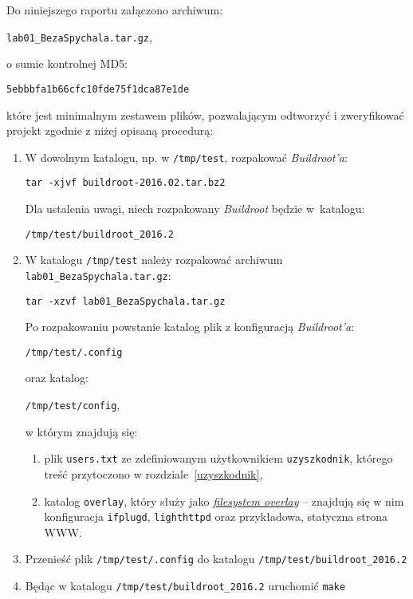 \documentclass{article}
\begin{document}
Do niniejszego raportu załączono archiwum:
\begin{center}
\texttt{lab01\_BezaSpychala.tar.gz},
\end{center}
o sumie kontrolnej MD5:
\begin{center}
\texttt{5ebbbfa1b66cfc10fde75f1dca87e1de}
\end{center}
które jest minimalnym zestawem plików, pozwalającym odtworzyć i zweryfikować projekt zgodnie z niżej opisaną procedurą:
\begin{enumerate}
\item W dowolnym katalogu, np. w \texttt{/tmp/test}, rozpakować \emph{Buildroot'a}:
\begin{center}
\texttt{tar -xjvf buildroot-2016.02.tar.bz2}
\end{center}

Dla ustalenia uwagi, niech rozpakowany \emph{Buildroot} będzie w~katalogu:
\begin{center}
\texttt{/tmp/test/buildroot\_2016.2}
\end{center}

\item W katalogu \texttt{/tmp/test} należy rozpakować archiwum \texttt{lab01\_BezaSpychala.tar.gz}:
\begin{center}
\texttt{tar -xzvf lab01\_BezaSpychala.tar.gz}
\end{center}

Po rozpakowaniu powstanie katalog plik z konfiguracją \emph{Buildroot'a}:
\begin{center}
\texttt{/tmp/test/.config}\\
\end{center}
oraz katalog:
\begin{center}
\texttt{/tmp/test/config},
\end{center}
w którym znajdują się:
	\begin{enumerate}
		\item plik \texttt{users.txt} ze zdefiniowanym użytkownikiem \texttt{uzyszkodnik}, którego treść przytoczono w rozdziale~\ref{uzyszkodnik},
		\item katalog \texttt{overlay}, który służy jako \emph{\href{https://buildroot.org/downloads/manual/manual.html\#customize}{filesystem overlay}} -- znajdują się w nim konfiguracja \texttt{ifplugd}, \texttt{lighthttpd} oraz przykładowa, statyczna strona WWW.
	\end{enumerate}
\item Przenieść plik \texttt{/tmp/test/.config} do katalogu \texttt{/tmp/test/buildroot\_2016.2}
\item Będąc w katalogu \texttt{/tmp/test/buildroot\_2016.2} uruchomić \texttt{make}
\end{enumerate}
\end{document}
